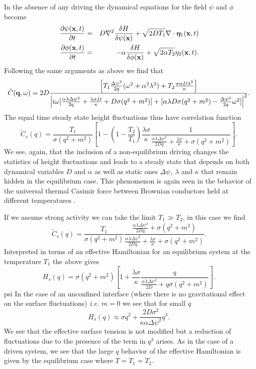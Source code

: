 In the absence of any driving the dynamical equations for the field $\psi$ and $\phi$ become 
\begin{eqnarray}
\frac{\partial \psi({\bf x},t)}{\partial t} &=& D\nabla^2\frac{\delta H}{\delta \psi({\bf x})}+ \sqrt{2D T_1}\nabla \cdot {\bm \eta}_1({\bf x},t) \\
\frac{\partial \phi({\bf x},t)}{\partial t} &=& -\alpha\frac{\delta H}{\delta \phi({\bf x})}+ \sqrt{2\alpha T_2}{ \eta}_2({\bf x},t).
\end{eqnarray}
Following the same arguments as above we find that
\begin{equation}
    \hat C({\bf q},\omega)  = 2D \frac{\left[ T_1\frac{\Delta\psi^2}{2q}(\omega^2+\alpha^2 \lambda^2) + T_2\frac{\sigma\alpha D\lambda^2}{\kappa}\right]}{\left|i\omega[\frac{\alpha\lambda\Delta\psi^2}{2 q} +  \frac{\lambda \sigma D}{\kappa} + D\sigma(q^2+m^2)]
+[\alpha\lambda D\sigma(q^2+m^2) -\frac{\Delta\psi^2}{2q}\omega^2]\right|^2}.
\end{equation}
The equal time steady state height fluctuations thus have correlation function
\begin{equation}
    \tilde C_s(q) = \frac{T_1}{\sigma (q^2 + m^2)}\left[ 1 -(1-\frac{T_2}{T_1})\frac{\lambda\sigma } {\kappa }\frac{1}{\frac{\alpha\lambda \Delta \psi^2}{2Dq}+ \frac{\lambda\sigma }{\kappa} + \sigma(q^2+m^2)}\right].
\end{equation}
We see, again, that the inclusion of a non-equilibrium driving changes the statistics of height fluctuations and leads to a steady state that depends on both dynamical variables
$D$ and $\alpha$ as well as static ones $\Delta\psi,\ \lambda$ and $\kappa$ that remain hidden in the equilibrium case. This phenomenon is again seen in the behavior of the universal thermal  Casimir force between Brownian conductors held at different temperatures \cite{lu_out--equilibrium_2015}.

If we assume strong activity we can take the limit $T_1\gg T_2$, in this case we find
\begin{equation}
    \tilde C_s(q) = \frac{T_1}{\sigma (q^2 + m^2)}\frac{\frac{\alpha\lambda \Delta \psi^2}{2Dq}+
\sigma(q^2+m^2)}{\frac{\alpha\lambda \Delta \psi^2}{2Dq}+ \frac{\lambda\sigma }{\kappa} + \sigma(q^2+m^2)}.
\end{equation}
Interpreted in terms of an effective Hamiltonian for an equilibrium system at the temperature $T_1$ the above gives
\begin{equation}
    H_s(q) = \sigma (q^2 + m^2)\left[1+\frac{\lambda\sigma }{\kappa}\frac{q}{\frac{\alpha\lambda \Delta \psi^2}{2D}+
q\sigma(q^2+m^2)}\right].
\end{equation}psi
In the case of an unconfined interface (where there is no gravitational effect
on the surface fluctuations) {\em i.e.} $m=0$ we see that for small $q$
\begin{equation}
    H_s(q) \approx \sigma q^2 +\frac{2D\sigma^2 }{\kappa\alpha \Delta\psi^2}q^3 .
\end{equation}
We see that the effective surface tension is not modified but a reduction of fluctuations due to the presence of the term in $q^3$ arises.  As in the case of a driven system, we see that the large $q$ behavior of the effective Hamiltonian is given by the equilibrium case where $T=T_1=T_2$. 

